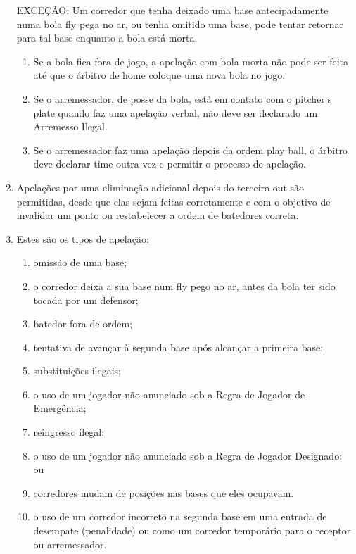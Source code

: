 \begin{enumerate}[label=(\alph*)]
	\vspace{3mm}
	EXCEÇÃO: Um corredor que tenha deixado uma base antecipadamente numa  bola \gls{fly} pega no ar, ou tenha omitido uma base, pode tentar retornar para tal  base enquanto a bola está morta.

	\begin{enumerate}[label=\roman*.]
		\item Se a bola fica fora de jogo, a apelação com bola morta não pode ser feita até que o árbitro de \gls{home} coloque uma nova bola no jogo.
		\item  Se o arremessador, de posse da bola, está em contato com o \gls{pitcher's plate} quando faz uma apelação verbal, não deve ser declarado um Arremesso Ilegal.
		\item  Se o arremessador faz uma apelação depois da ordem \gls{play ball}, o árbitro deve declarar \gls{time} outra vez e permitir o processo de apelação.
	\end{enumerate}
	\item Apelações por uma eliminação adicional depois do terceiro \gls{out} são permitidas, desde que elas sejam feitas corretamente e com o objetivo de invalidar um ponto ou restabelecer a ordem de batedores correta.

	\item  Estes são os tipos de apelação:
	\begin{enumerate}[label=\roman*.]
		\item omissão de uma base;
		\item  o corredor deixa a sua base num \gls{fly} pego no ar, antes da bola ter sido tocada por um defensor;
		\item  batedor fora de ordem;
		\item  tentativa de avançar à segunda base após alcançar a primeira base;
		\item  substituições ilegais;
		\item  o uso de um jogador não anunciado sob a Regra de Jogador de Emergência;
		\item  reingresso ilegal;
		\item  o uso de um jogador não anunciado sob a Regra de Jogador Designado; ou
		\item  corredores mudam de posições nas bases que eles ocupavam.
		\item  o uso de um corredor incorreto na segunda base em uma entrada de desempate (penalidade) ou como um corredor temporário para o receptor ou arremessador.
	\end{enumerate}
\end{enumerate}


